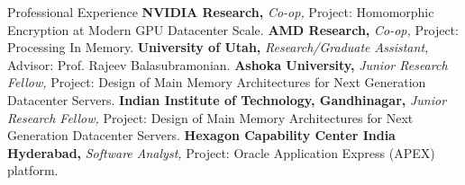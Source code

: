 \begin{rubric}{Professional Experience}
\entry*[05/22 -- 08/22]%
	\textbf{NVIDIA Research,} \textit{Co-op,} Project: Homomorphic Encryption at Modern GPU Datacenter Scale.
\entry*[05/20 -- 08/20]%
	\textbf{AMD Research,} \textit{Co-op,} Project: Processing In Memory.
%
	\textbf{University of Utah,} \textit{Research/Graduate Assistant,} Advisor: Prof. Rajeev Balasubramonian.
\entry*[09/18 -- 06/19]%
	\textbf{Ashoka University,} \textit{Junior Research Fellow,} Project: Design of Main Memory Architectures for Next Generation Datacenter Servers.
\entry*[01/18 -- 08/18]%
	\textbf{Indian Institute of Technology, Gandhinagar,} \textit{Junior Research Fellow,} Project: Design of Main Memory Architectures for Next Generation Datacenter Servers.
\entry*[08/17 -- 12/17]%
	\textbf{Hexagon Capability Center India Hyderabad,} \textit{Software Analyst,} Project: Oracle Application Express (APEX) platform.
%
%
\end{rubric}